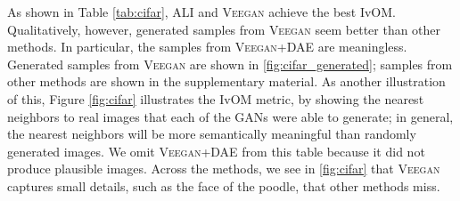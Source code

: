 \documentclass{article}
\newcommand{\acronym}{\textsc{Veegan}\xspace}
\begin{document}
As shown in Table \ref{tab:cifar}, ALI and \acronym achieve the best IvOM.  
Qualitatively, however, generated samples from \acronym
seem better than other methods. In particular, the samples from \acronym+DAE are
meaningless. Generated samples from \acronym are shown in \autoref{fig:cifar_generated}; samples from other methods
are shown in the supplementary material. As another illustration of this, Figure \ref{fig:cifar} illustrates the IvOM metric, by showing
the nearest neighbors to real images that each of the GANs
were able to generate; in general, the nearest neighbors
will be more semantically meaningful than randomly generated
images. We omit \acronym+DAE from this table because it did not produce plausible images.
Across the methods, we see in \autoref{fig:cifar}  that
\acronym captures small details, such as the face of the poodle, that other methods miss.


\end{document}
